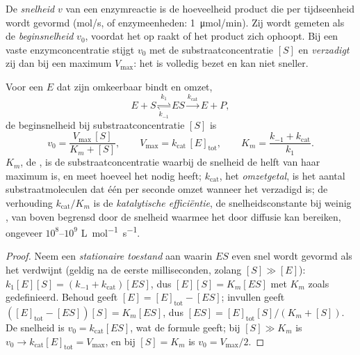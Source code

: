\begin{definition}\label{def:b1:enzymes:rate}
De \emph{snelheid} $v$ van een enzymreactie is de
hoeveelheid product die per tijdseenheid wordt gevormd (\unit{mol/s}, of
enzymeenheden: \qty{1}{\micro mol/min}). Zij wordt gemeten als de
\emph{beginsnelheid} $v_0$, voordat het  op raakt of het product zich
ophoopt. Bij een vaste enzymconcentratie stijgt $v_0$ met de substraatconcentratie
$[S]$ en \emph{verzadigt} zij dan bij een maximum $V_{\max}$: het  is volledig
bezet en kan niet sneller.
\end{definition}

\begin{theorem}\label{thm:b1:enzymes:mm}
Voor een  $E$ dat zijn  omkeerbaar bindt en omzet,
\[
E + S \underset{k_{-1}}{\overset{k_1}{\rightleftharpoons}} ES
\overset{k_{\text{cat}}}{\longrightarrow} E + P ,
\]
de beginsnelheid bij substraatconcentratie $[S]$ is
\[
v_0 = \frac{V_{\max}\,[S]}{K_m + [S]}, \qquad V_{\max} = k_{\text{cat}}\,[E]_{\text{tot}},
\qquad K_m = \frac{k_{-1} + k_{\text{cat}}}{k_1} .
\]
$K_m$, de \emph{}, is de substraatconcentratie waarbij de
snelheid de helft van haar maximum is, en meet hoeveel  het  nodig
heeft; $k_{\text{cat}}$, het \emph{omzetgetal}, is het aantal
substraatmoleculen dat één  per seconde omzet wanneer het verzadigd is; de
verhouding $k_{\text{cat}}/K_m$ is de \emph{katalytische efficiëntie}, de
snelheidsconstante bij weinig , van boven begrensd door de snelheid
waarmee  het  door diffusie kan bereiken, ongeveer
$10^8$--$10^9$ \unit{L.mol^{-1}.s^{-1}}.
\end{theorem}
\begin{proof}
Neem een \emph{stationaire toestand} aan waarin $ES$ even snel wordt gevormd als
het verdwijnt (geldig na de eerste milliseconden, zolang $[S] \gg [E]$):
$k_1[E][S] = (k_{-1} + k_{\text{cat}})[ES]$, dus $[E][S] = K_m[ES]$ met $K_m$ zoals
gedefinieerd. Behoud geeft $[E] = [E]_{\text{tot}} -
[ES]$; invullen geeft $([E]_{\text{tot}} - [ES])[S] = K_m[ES]$, dus
$[ES] = [E]_{\text{tot}}[S]/(K_m + [S])$. De snelheid is
$v_0 = k_{\text{cat}}[ES]$, wat de formule geeft; bij $[S] \gg K_m$ is
$v_0 \to k_{\text{cat}}[E]_{\text{tot}} = V_{\max}$, en bij $[S] = K_m$ is
$v_0 = V_{\max}/2$.
\end{proof}

